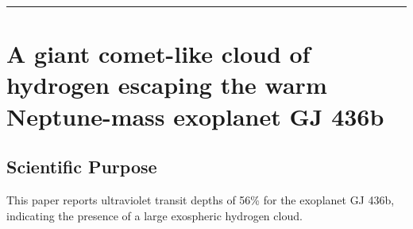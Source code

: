 \documentclass[onecolumn]{aastex63}
\begin{document}




\vspace{1cm}
\hrule
\vspace{1cm}

\section{A giant comet-like cloud of hydrogen escaping the warm Neptune-mass exoplanet GJ 436b}
\begin{centering}

\cite{ehrenreich2015}

\end{centering}



\subsection{Scientific Purpose}
This paper reports ultraviolet transit depths of 56\% for the exoplanet GJ 436b, indicating the presence of a large exospheric hydrogen cloud.

\end{document}
